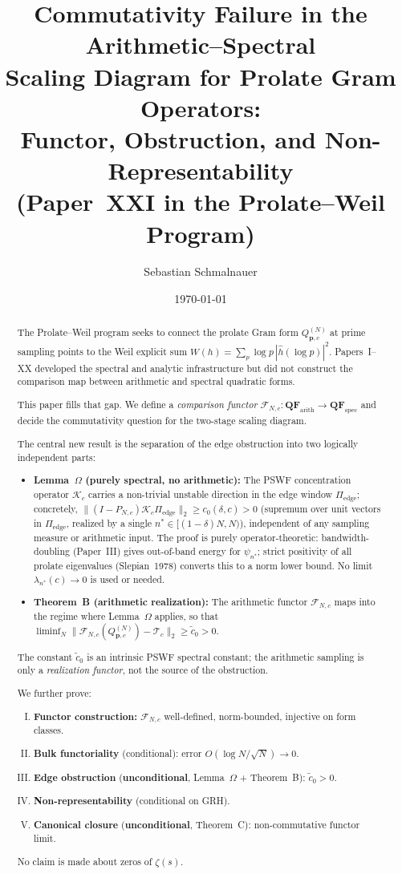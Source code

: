 \documentclass[12pt,a4paper]{amsart}
\title[Commutativity Failure in the Arithmetic--Spectral Diagram]
      {Commutativity Failure in the Arithmetic--Spectral\\
       Scaling Diagram for Prolate Gram Operators:\\
       Functor, Obstruction, and Non-Representability\\[4pt]
       \large (Paper~XXI in the Prolate--Weil Program)}
\author{Sebastian Schmalnauer}
\date{\today}
\theoremstyle{definition}
\newcommand{\Kop}{\mathcal{K}_c}
\newcommand{\QM}{Q^{(N)}_{\mathbf{p},c}}
\newcommand{\norm}[1]{\|#1\|}
\newcommand{\Fcal}{\mathcal{F}_{N,c}}
\newcommand{\Tcal}{\mathcal{T}_c}
\newcommand{\PN}{P_{N,c}}
\newcommand{\Pedge}{\Pi_{\mathrm{edge}}}
\begin{document}
\maketitle

\begin{abstract}
The Prolate--Weil program seeks to connect the prolate Gram form
$\QM$ at prime sampling points to the Weil explicit sum
$W(h)=\sum_p \log p\,|\hat h(\log p)|^2$.
Papers~I--XX developed the spectral and analytic infrastructure
but did not construct the comparison map between arithmetic and
spectral quadratic forms.

This paper fills that gap.
We define a \emph{comparison functor}
$\Fcal: \mathbf{QF}_{\mathrm{arith}} \to \mathbf{QF}_{\mathrm{spec}}$
and decide the commutativity question for the two-stage scaling
diagram.

The central new result is the separation of the edge obstruction
into two logically independent parts:
\begin{itemize}
  \item \textbf{Lemma~$\Omega$ (purely spectral, no arithmetic):}
  The PSWF concentration operator $\Kop$ carries a non-trivial
  unstable direction in the edge window $\Pedge$;
  concretely, $\|(I - \PN)\Kop\Pedge\|_2 \ge c_0(\delta,c) > 0$
  (supremum over unit vectors in $\Pedge$, realized by a single
  $n^* \in [(1-\delta)N, N)$), independent of any sampling measure
  or arithmetic input.
  The proof is purely operator-theoretic: bandwidth-doubling
  (Paper~III) gives out-of-band energy for $\psi_{n^*}$;
  strict positivity of all prolate eigenvalues (Slepian~1978)
  converts this to a norm lower bound.
  No limit $\lambda_{n^*}(c)\to 0$ is used or needed.
  \item \textbf{Theorem~B (arithmetic realization):}
  The arithmetic functor $\Fcal$ maps into the regime where
  Lemma~$\Omega$ applies, so that
  $\liminf_N \norm{\Fcal(\QM) - \Tcal}_2 \ge \tilde c_0 > 0$.
\end{itemize}
The constant $\tilde c_0$ is an intrinsic PSWF spectral constant;
the arithmetic sampling is only a \emph{realization functor},
not the source of the obstruction.

We further prove:
\begin{enumerate}[(I)]
  \item \textbf{Functor construction:} $\Fcal$ well-defined,
  norm-bounded, injective on form classes.
  \item \textbf{Bulk functoriality} (conditional):
  error $O(\log N/\sqrt{N}) \to 0$.
  \item \textbf{Edge obstruction} (\textbf{unconditional},
  Lemma~$\Omega$ + Theorem~B): $\tilde c_0 > 0$.
  \item \textbf{Non-representability} (conditional on GRH).
  \item \textbf{Canonical closure} (\textbf{unconditional},
  Theorem~C): non-commutative functor limit.
\end{enumerate}
No claim is made about zeros of $\zeta(s)$.
\end{abstract}
\end{document}
